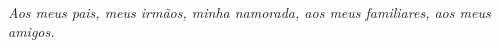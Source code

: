 %
%
\

\vfill

\begin{flushright}
\hfill \textit{Aos meus pais, meus irmãos, minha namorada, aos meus familiares, aos meus amigos.}
\end{flushright}
\vspace*{1cm}

\clearpage



